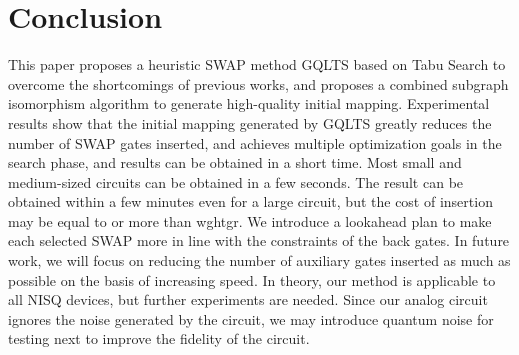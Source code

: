 \documentclass[runningheads]{llncs}
\begin{document}
 \section{Conclusion}
 \label{Conclusion}
 This paper proposes a heuristic SWAP method GQLTS based on Tabu Search to 
 overcome the shortcomings of previous works, 
 and proposes a combined subgraph isomorphism algorithm to generate high-quality initial mapping. 
 Experimental results show that the initial mapping generated by GQLTS greatly 
 reduces the number of SWAP gates inserted, 
 and achieves multiple optimization goals in the search phase, 
 and results can be obtained in a short time. 
 Most small and medium-sized circuits can be obtained in a few seconds. 
 The result can be obtained within a few minutes even for a large circuit, 
 but the cost of insertion may be equal to or more than wghtgr. 
 We introduce a lookahead plan to make each selected SWAP more in line with the 
 constraints of the back gates. 
 In future work, we will focus on reducing the number of auxiliary gates inserted as much as possible 
 on the basis of increasing speed. 
 In theory, our method is applicable to all NISQ devices, 
 but further experiments are needed. 
Since our analog circuit ignores the noise generated by the circuit,
we may introduce quantum noise for testing next to improve the fidelity of the circuit.
\appendix
\end{document}
